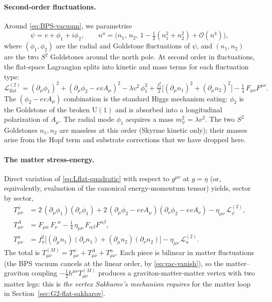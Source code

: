 \documentclass[11pt]{article}
\newcommand{\U}{\mathrm{U}}
\begin{document}
\paragraph{Second-order fluctuations.}  Around \eqref{eq:BPS-vacuum},
we parametrise
\begin{equation}
  \psi = v + \phi_1 + i\phi_2,
  \qquad
  n^a = \big(n_1,\,n_2,\,1 - \tfrac{1}{2}(n_1^2 + n_2^2) + \mathcal{O}(n^4)\big),
  \label{eq:fluct-param}
\end{equation}
where $(\phi_1, \phi_2)$ are the radial and Goldstone fluctuations
of $\psi$, and $(n_1, n_2)$ are the two $S^2$ Goldstones around the
north pole.  At second order in fluctuations, the flat-space
Lagrangian splits into kinetic and mass terms for each fluctuation
type:
\begin{equation}
\mathcal{L}_{\mathrm{flat}}^{(2)}
  = (\partial_\mu \phi_1)^2
  + (\partial_\mu \phi_2 - e v A_\mu)^2
  - \lambda v^2\,\phi_1^2
  + \tfrac{f_\pi^2}{2}\big[(\partial_\mu n_1)^2 + (\partial_\mu n_2)^2\big]
  - \tfrac{1}{4}\,F_{\mu\nu}F^{\mu\nu}.
\label{eq:Lflat-quadratic}
\end{equation}
The $(\phi_2 - e v A_\mu)$ combination is the standard Higgs
mechanism eating: $\phi_2$ is the Goldstone of the broken $\U(1)$
and is absorbed into a longitudinal polarization of $A_\mu$.  The
radial mode $\phi_1$ acquires a mass $m_\psi^2 = \lambda v^2$.  The
two $S^2$ Goldstones $n_1, n_2$ are massless at this order
(Skyrme kinetic only); their masses arise from the Hopf term and
substrate corrections that we have dropped here.

\paragraph{The matter stress-energy.}  Direct variation of
\eqref{eq:Lflat-quadratic} with respect to $g^{\mu\nu}$ at
$g = \eta$ (or, equivalently, evaluation of the canonical
energy-momentum tensor) yields, sector by sector,
\begin{align}
T^{\psi}_{\mu\nu}
  &= 2\,(\partial_\mu \phi_1)(\partial_\nu \phi_1)
  + 2\,(\partial_\mu \phi_2 - e v A_\mu)(\partial_\nu \phi_2 - e v A_\nu)
  - \eta_{\mu\nu}\,\mathcal{L}^{(2)}_\psi,
  \label{eq:Tpsi}\\
T^{A}_{\mu\nu}
  &= F_{\mu\alpha}\,{F_\nu}^\alpha
  - \tfrac{1}{4}\,\eta_{\mu\nu}\,F_{\alpha\beta} F^{\alpha\beta},
  \label{eq:TA}\\
T^{n}_{\mu\nu}
  &= f_\pi^2\big[(\partial_\mu n_1)(\partial_\nu n_1)
                + (\partial_\mu n_2)(\partial_\nu n_2)\big]
  - \eta_{\mu\nu}\,\mathcal{L}^{(2)}_n.
  \label{eq:Tn}
\end{align}
The total is $T^{(M)}_{\mu\nu} = T^{\psi}_{\mu\nu} + T^{A}_{\mu\nu}
+ T^{n}_{\mu\nu}$.  Each piece is bilinear in matter fluctuations
(the BPS vacuum cancels at the linear order, by
\eqref{eq:vac-vanish}), so the matter--graviton coupling
$-\tfrac{1}{2} h^{\mu\nu} T^{(M)}_{\mu\nu}$ produces a
graviton-matter-matter vertex with two matter legs: this is
\emph{the vertex Sakharov's mechanism requires} for the matter loop
in Section~\ref{sec:G2-flat-sakharov}.
\end{document}
